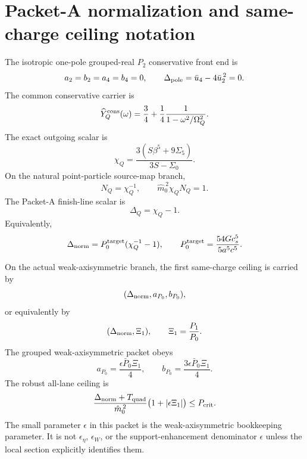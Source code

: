 \section{Packet-A normalization and same-charge ceiling notation}
\label{sec:packet-a-notation}

The isotropic one-pole grouped-real \(P_2\) conservative front end is
\begin{equation}
  a_2=b_2=a_4=b_4=0,
  \qquad
  \Delta_{\rm pole}=\bar u_4-4\bar u_2^{\,2}=0.
\end{equation}
The common conservative carrier is
\begin{equation}
  \widehat Y_Q^{\rm cons}(\omega)
  =
  \frac34+\frac14\frac{1}{1-\omega^2/\Omega_Q^2}.
\end{equation}
The exact outgoing scalar is
\begin{equation}
  \chi_Q=\frac{3(S\beta^5+9\Sigma_5)}{3S-\Sigma_0}.
\end{equation}
On the natural point-particle source-map branch,
\begin{equation}
  N_Q=\chi_Q^{-1},
  \qquad
  \hat m_0^{\,2}\chi_QN_Q=1.
\end{equation}
The Packet-A finish-line scalar is
\begin{equation}
  \Delta_Q=\chi_Q-1.
\end{equation}
Equivalently,
\begin{equation}
  \Delta_{\rm norm}=P_0^{\rm target}(\chi_Q^{-1}-1),
  \qquad
  P_0^{\rm target}=\frac{54Gc_s^5}{5a^5c^5}.
\end{equation}

On the actual weak-axisymmetric branch, the first same-charge ceiling is carried by
\begin{equation}
  (\Delta_{\rm norm},a_{P_0},b_{P_0}),
\end{equation}
or equivalently by
\begin{equation}
  (\Delta_{\rm norm},\Xi_1),
  \qquad
  \Xi_1=\frac{P_1}{P_0}.
\end{equation}
The grouped weak-axisymmetric packet obeys
\begin{equation}
  a_{P_0}=\frac{\epsilon\bar P_0\Xi_1}{4},
  \qquad
  b_{P_0}=\frac{3\epsilon\bar P_0\Xi_1}{4}.
\end{equation}
The robust all-lane ceiling is
\begin{equation}
  \frac{\Delta_{\rm norm}+T_{\rm quad}}{\hat m_0^{\,2}}
  \bigl(1+|\epsilon\Xi_1|\bigr)
  \le
  P_{\rm crit}.
\end{equation}
The small parameter \(\epsilon\) in this packet is the weak-axisymmetric bookkeeping parameter.  It is not \(\epsilon_\eta\), \(\epsilon_W\), or the support-enhancement denominator \(\epsilon\) unless the local section explicitly identifies them.

